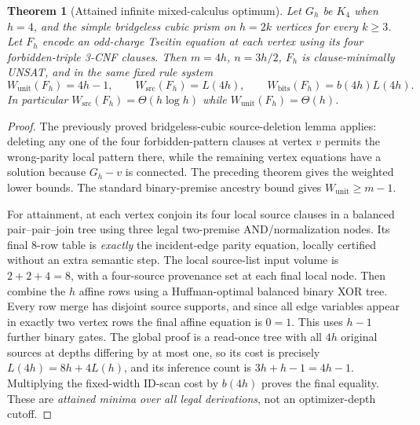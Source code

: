 \documentclass[11pt]{article}
\newtheorem{theorem}{Theorem}
\begin{document}
\begin{theorem}[Attained infinite mixed-calculus optimum]
Let $G_h$ be $K_4$ when $h=4$, and the simple bridgeless cubic prism on $h=2k$ vertices for every $k\ge3$. Let $F_h$ encode an odd-charge Tseitin equation at each vertex using its four forbidden-triple 3-CNF clauses. Then $m=4h$, $n=3h/2$, $F_h$ is clause-minimally UNSAT, and in the \emph{same} fixed rule system
\[
 \boxed{W_{\mathrm{unit}}(F_h)=4h-1,\qquad
 W_{\mathrm{src}}(F_h)=L(4h),\qquad
 W_{\mathrm{bits}}(F_h)=b(4h)L(4h).}
\tag{2}
\]
In particular $W_{\mathrm{src}}(F_h)=\Theta(h\log h)$ while $W_{\mathrm{unit}}(F_h)=\Theta(h)$.
\end{theorem}
\begin{proof}
The previously proved bridgeless-cubic source-deletion lemma applies: deleting any one of the four forbidden-pattern clauses at vertex $v$ permits the wrong-parity local pattern there, while the remaining vertex equations have a solution because $G_h-v$ is connected. The preceding theorem gives the weighted lower bounds. The standard binary-premise ancestry bound gives $W_{\mathrm{unit}}\ge m-1$.

For attainment, at each vertex conjoin its four local source clauses in a balanced pair--pair--join tree using three legal two-premise AND/normalization nodes. Its final 8-row table is \emph{exactly} the incident-edge parity equation, locally certified without an extra semantic step. The local source-list input volume is $2+2+4=8$, with a four-source provenance set at each final local node. Then combine the $h$ affine rows using a Huffman-optimal balanced binary XOR tree. Every row merge has disjoint source supports, and since all edge variables appear in exactly two vertex rows the final affine equation is $0=1$. This uses $h-1$ further binary gates. The global proof is a read-once tree with all $4h$ original sources at depths differing by at most one, so its cost is precisely $L(4h)=8h+4L(h)$, and its inference count is $3h+h-1=4h-1$. Multiplying the fixed-width ID-scan cost by $b(4h)$ proves the final equality. These are \emph{attained minima over all legal derivations}, not an optimizer-depth cutoff.
\end{proof}
\end{document}
